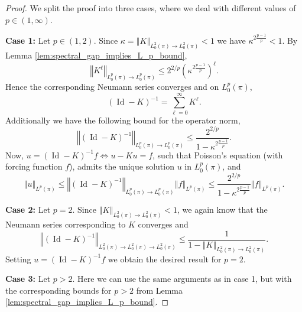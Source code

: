 \documentclass[10pt,a4paper]{amsart}
\DeclareMathOperator{\Id}{\text{Id}}
\newcommand{\norm}[1]{\left\Vert #1 \right\Vert}
\begin{document}
\begin{proof}
We split the proof into three cases, where we deal with different values of $p \in(1, \infty)$.

\textbf{Case 1:} Let $p \in (1,2)$. Since $\kappa = \norm{K}_{L^2_0(\pi) \to L^2_0(\pi)} <1$ we have $\kappa^{2\frac{p-1}{p}} <1$. 
By Lemma \ref{lem:spectral_gap_implies_L_p_bound},  
\[
\norm{K^\ell}_{L^p_0(\pi) \to L^p_0(\pi)} \leq 2^{2/p} \left(\kappa^{2\frac{p-1}{p}} \right)^\ell.
\]
Hence the corresponding Neumann series converges and on $L^p_0(\pi)$,  
\[
(\Id - K)^{-1} = \sum_{\ell=0}^\infty K^\ell.
\]
Additionally we have the following bound for the operator norm, 
\[
\norm{(\Id - K)^{-1}}_{L^p_0(\pi) \to L^p_0(\pi)} \leq \frac{2^{2/p}}{1- \kappa^{2\frac{p-1}{p}}}.
\]
Now, $ u = (\Id - K)^{-1} f \Leftrightarrow u - Ku =f$, such that Poisson's equation (with forcing function $f$), admits the unique solution $u$ in $L^p_0(\pi)$, and 
\[
\norm{u}_{L^p(\pi)} \leq \norm{(\Id - K)^{-1}}_{L^p_0(\pi) \to L^p_0(\pi)} \norm{f}_{L^p(\pi)} \leq \frac{2^{2/p}}{1- \kappa^{2\frac{p-1}{p}}} \norm{f}_{L^p(\pi)}.
\] 

\textbf{Case 2:} Let $p=2$. Since $\norm{K}_{L^2_0(\pi) \to L^2_0(\pi)} <1$, we again know that the Neumann series corresponding to $K$ converges and 
\[
\norm{(\Id - K)^{-1}}_{L^2_0(\pi) \to L^2_0(\pi) \to L^2_0(\pi)} \leq \frac{1}{1 - \norm{K}_{L^2_0(\pi) \to L^2_0(\pi)} }. 
\]
Setting $u = (\Id - K)^{-1}f$ we obtain the desired result for $p=2$.

\textbf{Case 3:} Let $p >2$. Here we can use the same arguments as in case 1, but with the corresponding bounds for $p >2$ from Lemma \ref{lem:spectral_gap_implies_L_p_bound}. 
\end{proof}
\end{document}
